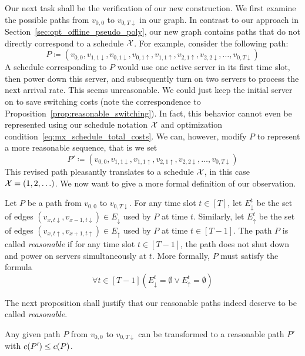 Our next task shall be the verification of our new construction. We first examine the possible paths from $v_{0,0}$ to $v_{0,T\downarrow}$ in our graph.
In contrast to our approach in Section~\ref{sec:opt_offline_pseudo_poly}, our new graph contains paths that do not directly correspond to a schedule $\mathcal{X}$. For example, consider the following path:
\begin{equation*}
	P\coloneqq(v_{0,0},v_{1,1\downarrow},v_{0,1\downarrow},v_{0,1\uparrow},v_{1,1\uparrow},v_{2,1\uparrow},v_{2,2\downarrow},\ldots,v_{0,T\downarrow})
\end{equation*}
A schedule corresponding to $P$ would use one active server in its first time slot, then power down this server, and subsequently turn on two servers to process the next arrival rate. This seems unreasonable. We could just keep the initial server on to save switching costs (note the correspondence to Proposition~\ref{prop:reasonable_switching}). In fact, this behavior cannot even be represented using our schedule notation $\mathcal{X}$ and optimization condition~\eqref{eq:mx_schedule_total_costs}. We can, however, modify $P$ to represent a more reasonable sequence, that is we set
\begin{equation*}
	P'\coloneqq(v_{0,0},v_{1,1\downarrow},v_{1,1\uparrow},v_{2,1\uparrow},v_{2,2\downarrow},\ldots,v_{0,T\downarrow})
\end{equation*}
This revised path pleasantly translates to a schedule $\mathcal{X}$, in this case $\mathcal{X}=(1,2,\ldots)$. We now want to give a more formal definition of our observation.
\begin{defn}\label{defn_reasn_paths}
Let $P$ be a path from $v_{0,0}$ to $v_{0,T\downarrow}$. For any time slot $t\in[T]$, let $E_\downarrow^t$ be the set of edges $(v_{x,t\downarrow},v_{x-1,t\downarrow})\in E_\downarrow$ used by $P$ at time $t$. Similarly, let $E_\uparrow^t$ be the set of edges $(v_{x,t\uparrow},v_{x+1,t\uparrow})\in E_\uparrow$ used by $P$ at time $t\in[T-1]$.
The path $P$ is called \textit{reasonable} if for any time slot $t\in[T-1]$, the path does not shut down and power on servers simultaneously at $t$. More formally, $P$ must satisfy the formula
\begin{equation}
	\forall t\in[T-1]\left(E_\downarrow^t=\emptyset \lor E_\uparrow^t=\emptyset\right)\label{eq:reasn_path}
\end{equation}
\end{defn}
The next proposition shall justify that our reasonable paths indeed deserve to be called \textit{reasonable}.
\begin{prop}\label{prop:path_to_reasn_path}
Any given path $P$ from $v_{0,0}$ to $v_{0,T\downarrow}$ can be transformed to a reasonable path $P'$ with $c(P')\le c(P)$.
\end{prop}
